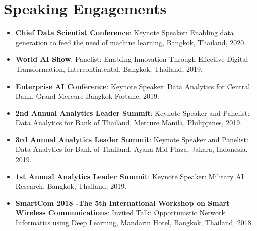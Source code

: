 \documentclass[letterpaper,11pt]{article}
\newcommand{\resumeItem}[2]{
  \item\small{
    \textbf{#1}{: #2 \vspace{-2pt}}
  }
}
\newcommand{\resumeSubItem}[2]{\resumeItem{#1}{#2}\vspace{-4pt}}
\newcommand{\resumeSubHeadingListStart}{\begin{itemize}[leftmargin=*]}
\newcommand{\resumeSubHeadingListEnd}{\end{itemize}}
\begin{document}
\begin{refsection}
	\nocite{Kerdsri2018}
  \nocite{7886152}
  \nocite{7332543}
  \nocite{Kerdsri2012}
  \nocite{6427357}
  \nocite{6174610}
  \nocite{waset2010}
	\AtNextBibliography{\small}
	\printbibliography[title={Conference Proceedings}]
\end{refsection}

\begin{refsection}
  \nocite{book2013}
  \nocite{book2013a}
  \nocite{book2012}
  \nocite{book2012a}
  \nocite{book2012b}
  \nocite{book2007}
  \nocite{kerdsri2003snmp}
	\AtNextBibliography{\small}
	\printbibliography[title={Books}]
\end{refsection}

\section{Speaking Engagements}
  \resumeSubHeadingListStart
  \resumeSubItem{Chief Data Scientist Conference}
    {Keynote Speaker: Enabling data generation to feed the need of machine learning, Bangkok, Thailand, 2020.}
    \resumeSubItem{World AI Show}
      {Panelist: Enabling Innovation Through Effective Digital Transformation, Intercontintental, Bangkok, Thailand, 2019.}
    \resumeSubItem{Enterprise AI Conference}
      {Keynote Speaker: Data Analytics for Central Bank, Grand Mercure Bangkok Fortune, 2019.}
     \resumeSubItem{2nd Annual Analytics Leader Summit}
      {Keynote Speaker and Panelist: Data Analytics for Bank of Thailand, Mercure Manila, Philippines, 2019.}
    \resumeSubItem{3rd Annual Analytics Leader Summit}
      {Keynote Speaker and Panelist: Data Analytics for Bank of Thailand, Ayana Mid Plaza, Jakara, Indonesia, 2019.}
    \resumeSubItem{1st Annual Analytics Leader Summit}
      {Keynote Speaker: Military AI Research, Bangkok, Thailand, 2019.}
    \resumeSubItem{SmartCom 2018 -The 5th International Workshop on Smart Wireless Communications}
      {Invited Talk: Opportunistic Network Informatics using Deep Learning, Mandarin Hotel, Bangkok, Thailand, 2018.}

  \resumeSubHeadingListEnd

\end{document}
